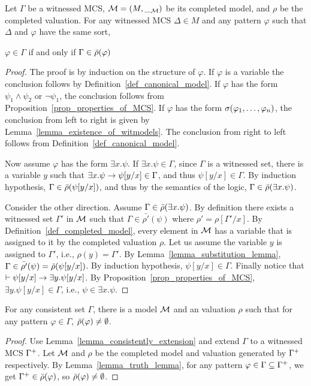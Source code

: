 \documentclass{amsart}
\begin{document}
\begin{lemma}
\label{lemma_truth_lemma}
Let $\Gamma$ be a witnessed MCS,
$\mathcal{M} = (M, \__{\mathcal{M}})$ be its completed model,
and $\rho$ be the completed valuation.
For any witnessed MCS $\Delta \in M$
and any pattern $\varphi$
such that $\Delta$ and $\varphi$ have the same sort,
\begin{center}
$\varphi \in \Gamma$ 
\quad if and only if \quad
$\Gamma \in \bar{\rho}(\varphi)$
\end{center}
\end{lemma}
\begin{proof}
The proof is by induction on the structure of $\varphi$.
If $\varphi$ is a variable
the conclusion follows by Definition~\ref{def_canonical_model}.
If $\varphi$ has the form $\psi_1 \wedge \psi_2$
or $\neg \psi_1$, the conclusion follows from 
Proposition~\ref{prop_properties_of_MCS}.
If $\varphi$ has the form $\sigma(\varphi_1 ,\dots, \varphi_n)$,
the conclusion from left to right is given by 
Lemma~\ref{lemma_existence_of_witmodels}.
The conclusion from right to left follows from
Definition~\ref{def_canonical_model}.

Now assume $\varphi$ has the form $\exists x . \psi$.
If $\exists x . \psi \in \Gamma$,
since $\Gamma$ is a witnessed set, there is a variable $y$ such that
$\exists x . \psi \to \psi[y / x] \in \Gamma$,
and thus $\psi[y / x] \in \Gamma$.
By induction hypothesis,
$\Gamma \in \bar{\rho}(\psi[y / x])$,
and thus by the semantics of the logic,
$\Gamma \in \bar{\rho}(\exists x . \psi)$.

Consider the other direction. Assume $\Gamma \in \bar{\rho}(\exists x .\psi)$.
By definition there exists a witnessed set $\Gamma'$ in $\mathcal{M}$ such that
$\Gamma \in \bar{\rho'}(\psi)$ where $\rho' = \rho[\Gamma' / x]$.
By Definition~\ref{def_completed_model},
every element in $\mathcal{M}$ has a variable that is assigned to it by the 
completed valuation $\rho$.
Let us assume the variable $y$ is assigned to $\Gamma'$, i.e.,
$\rho(y) = \Gamma'$.
By Lemma~\ref{lemma_substitution_lemma},
$\Gamma \in \bar{\rho'}(\psi) = \bar{\rho}(\psi[y/x])$.
By induction hypothesis,
$\psi[y/x] \in \Gamma$.
Finally notice that $\vdash \psi[y/x] \to \exists y . \psi[y/x]$.
By Proposition~\ref{prop_properties_of_MCS},
$\exists y . \psi[y/x] \in \Gamma$, i.e., $\psi \in \exists x . \psi$.

\end{proof}

\begin{theorem}
\label{thm_consistent_sets_have_models}
For any consistent set $\Gamma$,
there is a model $\mathcal{M}$ and an valuation $\rho$ such that
for any pattern $\varphi \in \Gamma$, $\bar{\rho}(\varphi) \neq \emptyset$.
\end{theorem}
\begin{proof}
Use Lemma~\ref{lemma_consistently_extension} and extend $\Gamma$ to a
witnessed MCS $\Gamma^+$.
Let $\mathcal{M}$ and $\rho$ be the completed model and valuation generated by
$\Gamma^+$ respectively.
By Lemma~\ref{lemma_truth_lemma}, 
for any pattern $\varphi \in \Gamma \subseteq \Gamma^+$, 
we get $\Gamma^+ \in \bar{\rho}(\varphi)$,
so $\bar{\rho}(\varphi) \neq \emptyset$.
\end{proof}
\end{document}
